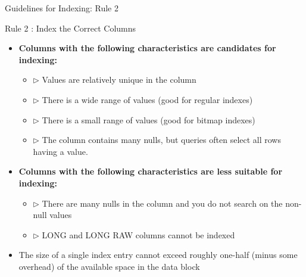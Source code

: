 \documentclass[aspectratio=169, xcolor=dvipsnames]{beamer}
\begin{document}
\begin{frame}{Guidelines for Indexing: Rule 2}
    \begin{alertblock}{Rule 2 : Index the Correct Columns}
        \begin{itemize}[<+->]
            \item \textbf{Columns with the following characteristics are candidates for indexing:}
            \begin{itemize}
                \item $\triangleright$ Values are relatively unique in the column
                \item $\triangleright$ There is a wide range of values (good for regular indexes)
                \item $\triangleright$ There is a small range of values (good for bitmap indexes)
                \item $\triangleright$ The column contains many nulls, but queries often select all rows having a value.
            \end{itemize}
            \item \textbf{Columns with the following characteristics are less suitable for indexing:}
            \begin{itemize}
                \item $\triangleright$ There are many nulls in the column and you do not search on the non-null values
                \item $\triangleright$ LONG and LONG RAW columns cannot be indexed
            \end{itemize}
            \item The size of a single index entry cannot exceed roughly one-half (minus some overhead) of the available space in the data block
        \end{itemize}
    \end{alertblock}
\end{frame}
\end{document}
